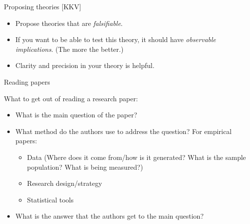 \documentclass[xcolor={dvipsnames},handout]{beamer}
\begin{document}

\begin{frame}{Proposing theories [KKV]}

\citep{king2021designing}

\begin{itemize}
\item Propose theories that are \textit{falsifiable}.
\item If you want to be able to test this theory, it should have \textit{observable implications}. (The more the better.) \
\item Clarity and precision in your theory is helpful. 
\end{itemize}

\end{frame}



\begin{frame}{Reading papers}

What to get out of reading a research paper:
\begin{itemize}
\item What is the main question of the paper?
\item What method do the authors use to address the question?
{For empirical papers:}
\begin{itemize}
\item Data (Where does it come from/how is it generated? What is the sample population? What is being measured?)\
\item Research design/strategy
\item Statistical tools
\end{itemize}
\item What is the answer that the authors get to the main question?
\end{itemize}

\end{frame}
\end{document}
